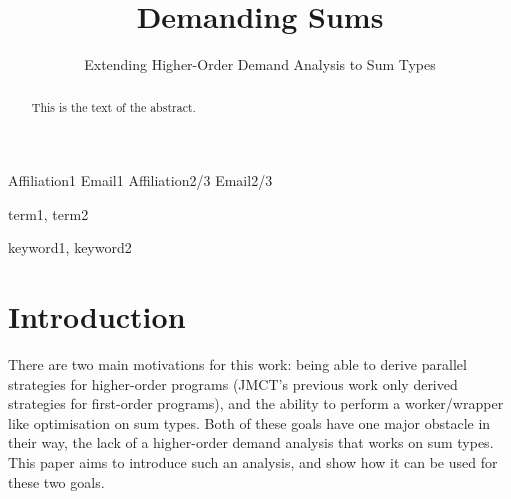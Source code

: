 \documentclass[preprint]{sigplanconf}
\begin{document}
\setlength{\pdfpageheight}{\paperheight}
\setlength{\pdfpagewidth}{\paperwidth}




\title{Demanding Sums}
\subtitle{Extending Higher-Order Demand Analysis to Sum Types}

           {Affiliation1}
           {Email1}
           {Affiliation2/3}
           {Email2/3}

\maketitle

\begin{abstract}
This is the text of the abstract.
\end{abstract}


\terms
term1, term2

\keywords
keyword1, keyword2

\section{Introduction}

There are two main motivations for this work: being able to derive parallel
strategies for higher-order programs (JMCT's previous work only derived
strategies for first-order programs), and the ability to perform a
worker/wrapper like optimisation on sum types. Both of these goals have one
major obstacle in their way, the lack of a higher-order demand analysis that
works on sum types. This paper aims to introduce such an analysis, and show how
it can be used for these two goals.
\end{document}
